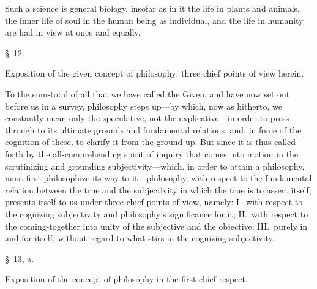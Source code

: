 \documentclass[12pt,a4paper]{book}
\begin{document}
{\small Such a science is general biology, insofar as in it the life in plants and
animals, the inner life of soul in the human being as individual, and the life in
humanity are had in view at once and equally.\par}

\begin{center}\large\S~12.\end{center}
\begin{center}Exposition of the given concept of philosophy: three chief points of
view herein.\end{center}

To the sum-total of all that we have called the Given, and have now set out before
us in a survey, philosophy steps up---by which, now as hitherto, we constantly mean
only the speculative, not the explicative---in order to press through to its
ultimate grounds and fundamental relations, and, in force of the cognition of
these, to clarify it from the ground up. But since it is thus called forth by the
all-comprehending spirit of inquiry that comes into motion in the scrutinizing and
grounding subjectivity---which, in order to attain a philosophy, must first
philosophize its way to it---philosophy, with respect to the fundamental relation
between the true and the subjectivity in which the true is to assert itself,
presents itself to us under three chief points of view, namely: I.~with respect to
the cognizing subjectivity and philosophy's significance for it; II.~with respect
to the coming-together into unity of the subjective and the objective; III.~purely
in and for itself, without regard to what stirs in the cognizing subjectivity.

\begin{center}\large\S~13, a.\end{center}
\begin{center}Exposition of the concept of philosophy in the first chief respect.\end{center}
\end{document}
